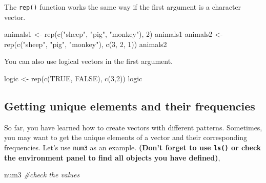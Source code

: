 \documentclass[
]{book}
\newenvironment{Shaded}{\begin{snugshade}}{\end{snugshade}}
\newcommand{\CommentTok}[1]{\textcolor[rgb]{0.56,0.35,0.01}{\textit{#1}}}
\newcommand{\ConstantTok}[1]{\textcolor[rgb]{0.00,0.00,0.00}{#1}}
\newcommand{\DecValTok}[1]{\textcolor[rgb]{0.00,0.00,0.81}{#1}}
\newcommand{\FunctionTok}[1]{\textcolor[rgb]{0.00,0.00,0.00}{#1}}
\newcommand{\NormalTok}[1]{#1}
\newcommand{\OtherTok}[1]{\textcolor[rgb]{0.56,0.35,0.01}{#1}}
\newcommand{\StringTok}[1]{\textcolor[rgb]{0.31,0.60,0.02}{#1}}
\begin{document}
The \texttt{rep()} function works the same way if the first argument is a character vector.

\begin{Shaded}
\begin{Highlighting}[]
\NormalTok{animals1 }\OtherTok{\textless{}{-}} \FunctionTok{rep}\NormalTok{(}\FunctionTok{c}\NormalTok{(}\StringTok{"sheep"}\NormalTok{, }\StringTok{"pig"}\NormalTok{, }\StringTok{"monkey"}\NormalTok{), }\DecValTok{2}\NormalTok{)}
\NormalTok{animals1}
\NormalTok{animals2 }\OtherTok{\textless{}{-}} \FunctionTok{rep}\NormalTok{(}\FunctionTok{c}\NormalTok{(}\StringTok{"sheep"}\NormalTok{, }\StringTok{"pig"}\NormalTok{, }\StringTok{"monkey"}\NormalTok{), }\FunctionTok{c}\NormalTok{(}\DecValTok{3}\NormalTok{, }\DecValTok{2}\NormalTok{, }\DecValTok{1}\NormalTok{))}
\NormalTok{animals2}
\end{Highlighting}
\end{Shaded}

You can also use logical vectors in the first argument.

\begin{Shaded}
\begin{Highlighting}[]
\NormalTok{logic }\OtherTok{\textless{}{-}} \FunctionTok{rep}\NormalTok{(}\FunctionTok{c}\NormalTok{(}\ConstantTok{TRUE}\NormalTok{, }\ConstantTok{FALSE}\NormalTok{), }\FunctionTok{c}\NormalTok{(}\DecValTok{3}\NormalTok{,}\DecValTok{2}\NormalTok{))}
\NormalTok{logic}
\end{Highlighting}
\end{Shaded}

\hypertarget{getting-unique-elements-and-their-frequencies}{%
\subsection{Getting unique elements and their frequencies}\label{getting-unique-elements-and-their-frequencies}}

So far, you have learned how to create vectors with different patterns. Sometimes, you may want to get the unique elements of a vector and their corresponding frequencies. Let's use \texttt{num3} as an example. \textbf{(Don't forget to use \texttt{ls()} or check the environment panel to find all objects you have defined)},

\begin{Shaded}
\begin{Highlighting}[]
\NormalTok{num3           }\CommentTok{\#check the values}
\end{Highlighting}
\end{Shaded}
\end{document}
